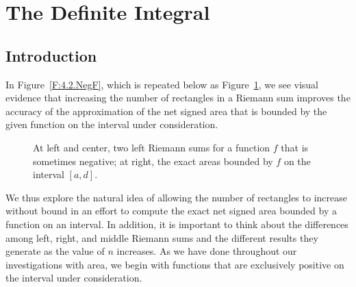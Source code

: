 \section{The Definite Integral} \label{S:4.3.DefiniteIntegral}

\vspace*{-14 pt}

\subsection*{Introduction}

In Figure~\ref{F:4.2.NegF}, which is repeated below as Figure~\ref{F:4.3.IncreaseN}, we see visual evidence that increasing the number of rectangles in a Riemann sum improves the accuracy of the approximation of the net signed area that is bounded by the given function on the interval under consideration.
\begin{figure}[h]
\begin{center}
\caption{At left and center, two left Riemann sums for a function $f$ that is sometimes negative; at right, the exact areas bounded by $f$ on the interval $[a,d]$.} \label{F:4.3.IncreaseN}
\end{center}
\end{figure}
We thus explore the natural idea of allowing the number of rectangles to increase without bound in an effort to compute the exact net signed area bounded by a function on an interval.  In addition, it is important to think about the differences among left, right, and middle Riemann sums and the different results they generate as the value of $n$ increases.  As we have done throughout our investigations with area, we begin with functions that are exclusively positive on the interval under consideration.

